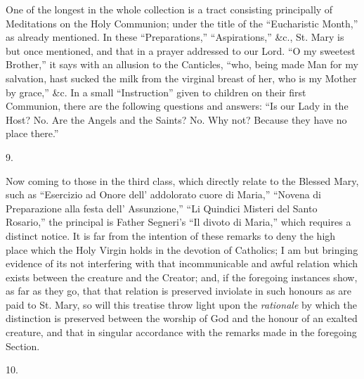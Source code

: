 One of the longest in the whole collection is a tract consisting
principally of Meditations on the Holy Communion; under the title of
the ``Eucharistic Month,'' as already mentioned. In these
``Preparations,'' ``Aspirations,'' \&c., St. Mary
is but once mentioned, and that in a prayer addressed to our Lord.
``O my sweetest Brother,'' it says with an allusion to the
Canticles, ``who, being made Man for my salvation, hast sucked the
milk from the virginal breast of her, who is my Mother by grace,''
\&c. In a small ``Instruction'' given to children on their
first Communion, there are the following questions and answers:
``Is our Lady in the Host? No. Are the Angels and the Saints? No.
Why not? Because they have no place there.''

9.

Now coming to those in the third class, which directly relate to
the Blessed Mary, such as ``Esercizio ad Onore dell' addolorato
cuore di Maria,'' ``Novena di Preparazione alla festa dell'
Assunzione,'' ``Li Quindici Misteri del Santo Rosario,''
the principal is Father Segneri's ``Il divoto di Maria,''
which requires a distinct notice. It is far from the intention of
these remarks to deny the high place which the Holy Virgin holds in
the devotion of Catholics; I am but bringing evidence of its not
interfering with that incommunicable and awful relation which exists
between the creature and the Creator; and, if the foregoing instances
show, as far as they go, that that relation is preserved inviolate in
such honours as are paid to St. Mary, so will this treatise throw
light upon the \emph{rationale} by which the distinction is preserved
between the worship of God and the honour of an exalted creature, and
that in singular accordance with the remarks made in the foregoing
Section.

10.

